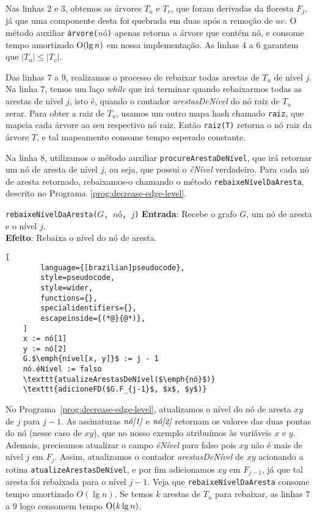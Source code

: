 Nas linhas $2$ e $3$, obtemos as árvores $T_u$ e $T_v$, que foram derivadas da floresta $F_j$, já que uma componente desta foi quebrada em duas após a remoção de $uv$. O método auxiliar \texttt{árvore($\textit{nó}$)} apenas retorna a árvore que contém nó, e consome tempo amortizado $\mathrm{O}(\lg n)$ em nossa implementação. As linhas $4$ a $6$ garantem que $|T_u| \leq |T_v|$. 

Das linhas $7$ a $9$, realizamos o processo de rebaixar todas arestas de $T_u$ de nível $j$. Na linha $7$, temos um laço \textit{while} que irá terminar quando rebaixarmos todas as arestas de nível $j$, isto é, quando o contador \textit{arestasDeNível} do nó raiz de $T_u$ zerar. Para obter a raiz de $T_u$, usamos um outro mapa hash chamado \texttt{raiz}, que mapeia cada árvore ao seu respectivo nó raiz. Então \texttt{raiz(T)} retorna o nó raiz da árvore $T$, e tal mapeamento consome tempo esperado constante.

Na linha $8$, utilizamos o método auxiliar \texttt{procureArestaDeNível}, que irá retornar um nó de aresta de nível $j$, ou seja, que possui o \textit{éNível} verdadeiro. Para cada nó de aresta retornado, rebaixamos-o chamando o método \texttt{rebaixeNívelDaAresta}, descrito no Programa~\ref{prog:decrease-edge-level}.


\begin{programruledcaption}{\texttt{rebaixeNívelDaAresta($G$, $\textit{nó}$, $j$)} \label{prog:decrease-edge-level}}
    \noindent\textbf{Entrada}: Recebe o grafo $G$, um nó de aresta e o nível $j$.\\
    \textbf{Efeito}: Rebaixa o nível do nó de aresta.
    \vspace{-0.5\baselineskip}
    \begin{lstlisting}[
        language={[brazilian]pseudocode},
        style=pseudocode,
        style=wider,
        functions={},
        specialidentifiers={},
        escapeinside={(*@}{@*)},
    ]
    x := nó[1]
    y := nó[2]
    G.$\emph{nível[x, y]}$ := j - 1
    nó.éNível := falso
    \texttt{atualizeArestasDeNível($\emph{nó}$)}
    \texttt{adicioneFD($G.F_{j-1}$, $x$, $y$)}

    \end{lstlisting}
    \vspace{-0.5\baselineskip}
\end{programruledcaption}

No Programa~\ref{prog:decrease-edge-level}, atualizamos o nível do nó de aresta $xy$ de $j$ para $j-1$. As assinaturas $\emph{nó[1]}$ e $\emph{nó[2]}$ retornam os valores das duas pontas do nó (nesse caso de $xy$), que no nosso exemplo atribuímos às variáveis $x$ e $y$. Ademais, precisamos atualizar o campo \textit{éNível} para falso pois $xy$ não é mais de nível $j$ em $F_j$. Assim, atualizamos o contador \textit{arestasDeNível} de $xy$ acionando a rotina \texttt{atualizeArestasDeNível}, e por fim adicionamos $xy$ em $F_{j-1}$, já que tal aresta foi rebaixada para o nível $j-1$. Veja que \texttt{rebaixeNívelDaAresta} consome tempo amortizado $O(\lg n)$. Se temos $k$ arestas de $T_u$ para rebaixar, as linhas $7$ a $9$ logo consomem tempo $\mathrm{O}(k \lg n)$.  

